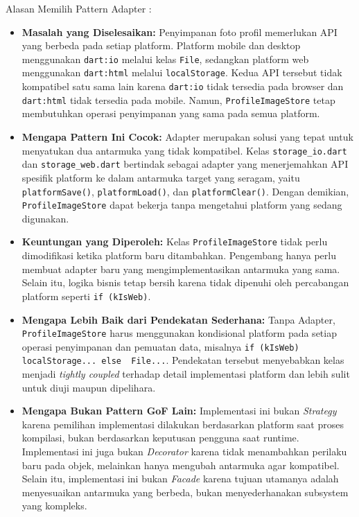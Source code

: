\documentclass[11pt]{article}
\begin{document}
Alasan Memilih Pattern Adapter :
\begin{itemize}

\item \textbf{Masalah yang Diselesaikan:} Penyimpanan foto profil memerlukan API yang berbeda pada setiap platform. Platform mobile dan desktop menggunakan \texttt{dart:io} melalui kelas \texttt{File}, sedangkan platform web menggunakan \texttt{dart:html} melalui \texttt{localStorage}. Kedua API tersebut tidak kompatibel satu sama lain karena \texttt{dart:io} tidak tersedia pada browser dan \texttt{dart:html} tidak tersedia pada mobile. Namun, \texttt{ProfileImageStore} tetap membutuhkan operasi penyimpanan yang sama pada semua platform.

\item \textbf{Mengapa Pattern Ini Cocok:} Adapter merupakan solusi yang tepat untuk menyatukan dua antarmuka yang tidak kompatibel. Kelas \texttt{storage\_io.dart} dan \texttt{storage\_web.dart} bertindak sebagai adapter yang menerjemahkan API spesifik platform ke dalam antarmuka target yang seragam, yaitu \texttt{platformSave()}, \texttt{platformLoad()}, dan \texttt{platformClear()}. Dengan demikian, \texttt{ProfileImageStore} dapat bekerja tanpa mengetahui platform yang sedang digunakan.

\item \textbf{Keuntungan yang Diperoleh:} Kelas \texttt{ProfileImageStore} tidak perlu dimodifikasi ketika platform baru ditambahkan. Pengembang hanya perlu membuat adapter baru yang mengimplementasikan antarmuka yang sama. Selain itu, logika bisnis tetap bersih karena tidak dipenuhi oleh percabangan platform seperti \texttt{if (kIsWeb)}.

\item \textbf{Mengapa Lebih Baik dari Pendekatan Sederhana:} Tanpa Adapter, \texttt{ProfileImageStore} harus menggunakan kondisional platform pada setiap operasi penyimpanan dan pemuatan data, misalnya \texttt{if (kIsWeb) { localStorage...} else { File...}}. Pendekatan tersebut menyebabkan kelas menjadi \textit{tightly coupled} terhadap detail implementasi platform dan lebih sulit untuk diuji maupun dipelihara.

\item \textbf{Mengapa Bukan Pattern GoF Lain:} Implementasi ini bukan \textit{Strategy} karena pemilihan implementasi dilakukan berdasarkan platform saat proses kompilasi, bukan berdasarkan keputusan pengguna saat runtime. Implementasi ini juga bukan \textit{Decorator} karena tidak menambahkan perilaku baru pada objek, melainkan hanya mengubah antarmuka agar kompatibel. Selain itu, implementasi ini bukan \textit{Facade} karena tujuan utamanya adalah menyesuaikan antarmuka yang berbeda, bukan menyederhanakan subsystem yang kompleks.

\end{itemize}
\end{document}
